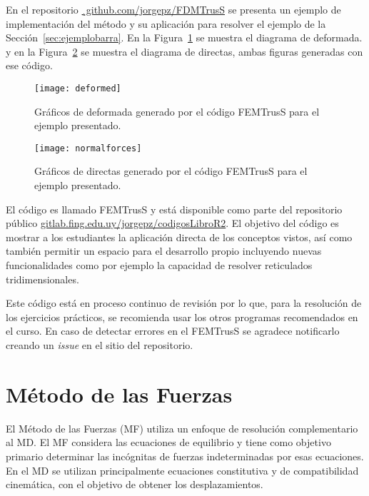 En el repositorio \href{https://github.com/jorgepz/FDMTrusS}{¸github.com/jorgepz/FDMTrusS} se presenta un ejemplo de implementación del método y su aplicación para resolver el ejemplo de la Sección~\ref{sec:ejemplobarra}. En la Figura~\ref{fig:ejbarraDef} se muestra el diagrama de deformada. y en la Figura~\ref{fig:ejbarraDir} se muestra el diagrama de directas, ambas figuras generadas con ese código.  %

\begin{figure}[htb!]
	\centering
	\texttt{[image: deformed]}
	\caption{Gráficos de deformada generado por el código FEMTrusS para el ejemplo presentado.}
	\label{fig:ejbarraDef}
\end{figure}

\begin{figure}[htb!]
	\centering
	\texttt{[image: normalforces]}
	\caption{Gráficos de directas generado por el código FEMTrusS para el ejemplo presentado.}
	\label{fig:ejbarraDir}
\end{figure}

El código es llamado FEMTrusS y está disponible como parte del repositorio público \href{https://gitlab.fing.edu.uy/jorgepz/codigosLibroR2}{gitlab.fing.edu.uy/jorgepz/codigosLibroR2}. %
%
El objetivo del código es mostrar a los estudiantes la aplicación directa de los conceptos vistos, así como también permitir un espacio para el desarrollo propio incluyendo nuevas funcionalidades como por ejemplo la capacidad de resolver reticulados tridimensionales. %

Este código está en proceso continuo de revisión por lo que, para la resolución de los ejercicios prácticos, se recomienda usar los otros programas recomendados en el curso. %
%
En caso de detectar errores en el FEMTrusS se agradece notificarlo creando un \textit{issue} en el sitio del repositorio.




\section{Método de las Fuerzas}


El Método de las Fuerzas (MF) utiliza un enfoque de resolución complementario al MD. El MF considera las ecuaciones de equilibrio y tiene como objetivo primario determinar las incógnitas de fuerzas indeterminadas por esas ecuaciones. %
%
En el MD se utilizan principalmente ecuaciones constitutiva y de  compatibilidad cinemática, con el objetivo de obtener los desplazamientos.


